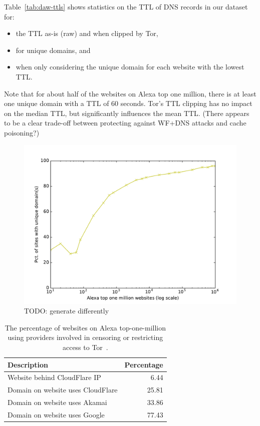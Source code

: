 Table~\ref{tab:daw-ttls} shows statistics on the TTL of DNS records in our dataset
for:
\begin{itemize}
	\item the TTL as-is (raw) and when clipped by Tor,
	\item for unique domains, and
	\item when only considering the unique domain for each website with the lowest
	TTL.
\end{itemize}
Note that for about half of the websites on Alexa top one million, there is at least
one unique domain with a TTL of 60 seconds. Tor's TTL clipping has no impact on
the median TTL, but significantly influences the mean TTL.
(There appears to be a clear trade-off between protecting against WF+DNS attacks
and cache poisoning?)

\begin{figure}[t]
	\centering
	\includegraphics[width=\linewidth]{figures/dns-unique-domains.pdf}
	\caption{TODO: generate differently}
	\label{fig:unique-domains}
\end{figure}

\begin{table}[t]
	\centering
	\begin{tabular}{l r}
	\toprule
	\textbf{Description} & \textbf{Percentage} \\
	\midrule
	Website behind CloudFlare IP & 6.44 \\
	Domain on website uses CloudFlare & 25.81 \\
	Domain on website uses Akamai & 33.86 \\
	Domain on website uses Google & 77.43 \\
	\bottomrule
	\end{tabular}
	\caption{The percentage of websites on Alexa top-one-million using providers
	involved in censoring or restricting access to Tor~\cite{Khattak2016a}.}
	\label{tab:dns-censor}
\end{table}

